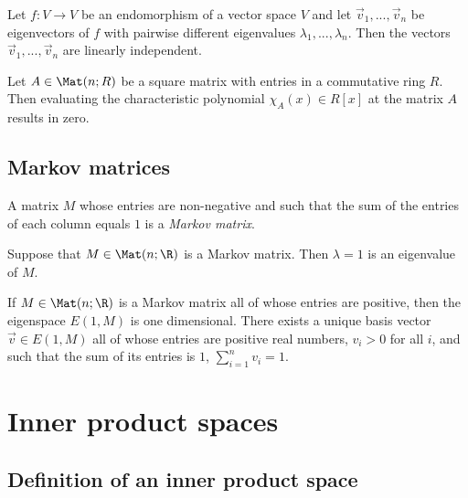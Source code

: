 \documentclass{article}
\begin{document}
\begin{lemma}[Lemma 4.6.9]
	Let $f:V\to V$ be an endomorphism of a vector space $V$ and let $\vec v_1,...,\vec v_n$ be
	eigenvectors of $f$ with pairwise different eigenvalues $\lambda_1,...,\lambda_n$. Then
	the vectors $\vec v_1,...,\vec v_n$ are linearly independent.
\end{lemma}

\begin{theorem}
	Let $A\in\Mat(n;R)$ be a square matrix with entries in a commutative ring $R$. Then evaluating the
	characteristic polynomial $\chi_A(x)\in R[x]$ at the matrix $A$ results in zero.
\end{theorem}

\subsection{Markov matrices}

\begin{definition}
	A matrix $M$ whose entries are non-negative and such that the sum of the entries of each
	column equals $1$ is a \emph{Markov matrix}.
\end{definition}

\begin{lemma}[Lemma 4.7.6]
	Suppose that $M\in\Mat(n;\R)$ is a Markov matrix. Then $\lambda=1$ is an eigenvalue of $M$.
\end{lemma}

\begin{theorem}[Perron]
	If $M\in\Mat(n;\R)$ is a Markov matrix all of whose entries are positive, then the eigenspace
	$E(1,M)$ is one dimensional. There exists a unique basis vector $\vec v\in E(1,M)$ all of whose
	entries are positive real numbers, $v_i>0$ for all $i$, and such that the sum of its entries is $1$,
	$\sum_{i=1}^n v_i=1$.
\end{theorem}

\section{Inner product spaces}

\subsection{Definition of an inner product space}
\end{document}
